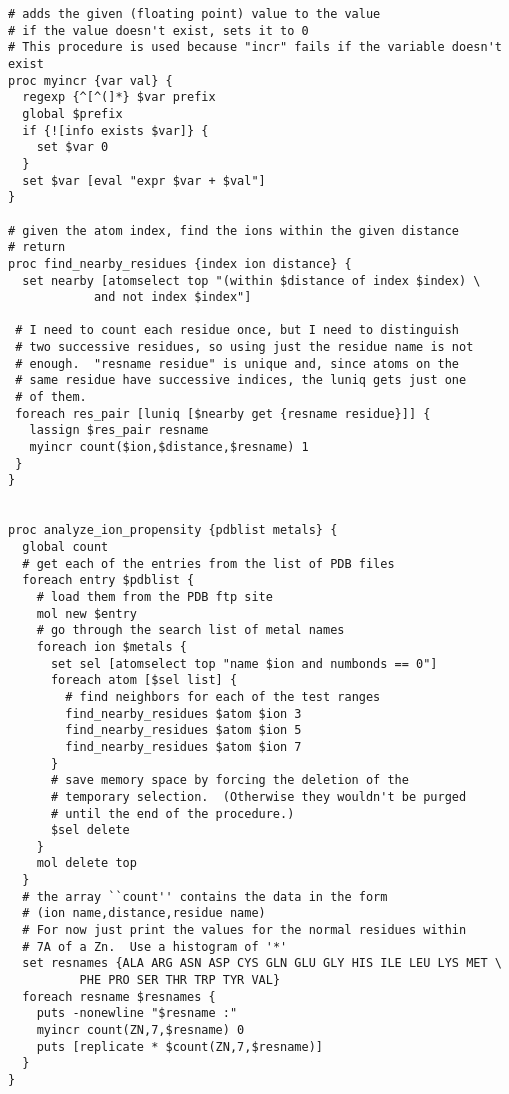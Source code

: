 \begin{verbatim}
# adds the given (floating point) value to the value
# if the value doesn't exist, sets it to 0
# This procedure is used because "incr" fails if the variable doesn't exist
proc myincr {var val} {
  regexp {^[^(]*} $var prefix
  global $prefix
  if {![info exists $var]} {
    set $var 0
  }
  set $var [eval "expr $var + $val"]
}

# given the atom index, find the ions within the given distance
# return 
proc find_nearby_residues {index ion distance} {
  set nearby [atomselect top "(within $distance of index $index) \
			and not index $index"]
 
 # I need to count each residue once, but I need to distinguish
 # two successive residues, so using just the residue name is not
 # enough.  "resname residue" is unique and, since atoms on the
 # same residue have successive indices, the luniq gets just one
 # of them.
 foreach res_pair [luniq [$nearby get {resname residue}]] {
   lassign $res_pair resname
   myincr count($ion,$distance,$resname) 1
 }
}


proc analyze_ion_propensity {pdblist metals} {
  global count
  # get each of the entries from the list of PDB files
  foreach entry $pdblist {
    # load them from the PDB ftp site
    mol new $entry
    # go through the search list of metal names
    foreach ion $metals {
      set sel [atomselect top "name $ion and numbonds == 0"]
      foreach atom [$sel list] {
        # find neighbors for each of the test ranges
        find_nearby_residues $atom $ion 3
        find_nearby_residues $atom $ion 5
        find_nearby_residues $atom $ion 7
      }
      # save memory space by forcing the deletion of the 
      # temporary selection.  (Otherwise they wouldn't be purged
      # until the end of the procedure.)
      $sel delete
    }
    mol delete top
  }
  # the array ``count'' contains the data in the form
  # (ion name,distance,residue name)
  # For now just print the values for the normal residues within
  # 7A of a Zn.  Use a histogram of '*'
  set resnames {ALA ARG ASN ASP CYS GLN GLU GLY HIS ILE LEU LYS MET \
          PHE PRO SER THR TRP TYR VAL}
  foreach resname $resnames {
    puts -nonewline "$resname :"
    myincr count(ZN,7,$resname) 0
    puts [replicate * $count(ZN,7,$resname)]
  }
}

\end{verbatim}

